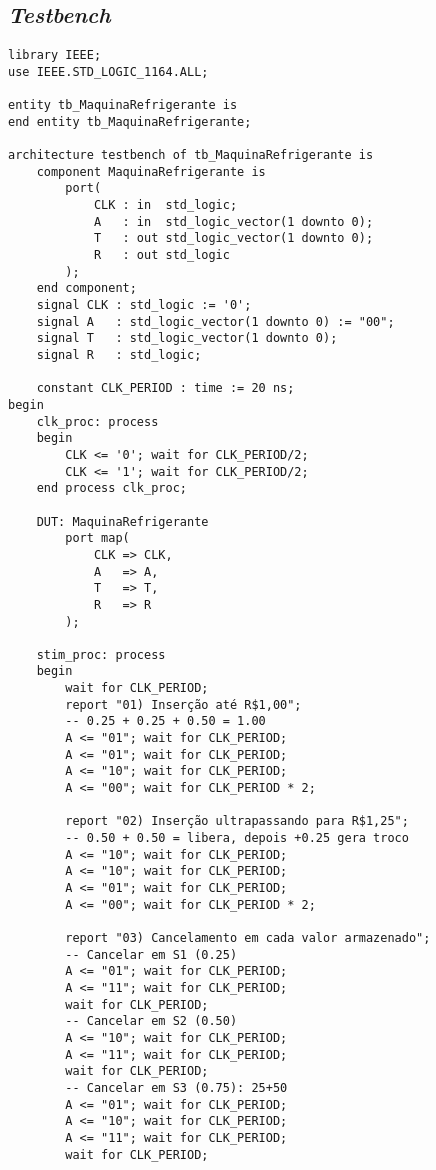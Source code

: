 \documentclass[a4paper,12pt]{article}
\newenvironment{code}{\captionsetup{type=listing}}{}
\begin{document}
\subsection{\textit{Testbench}}
\begin{code}
    \begin{verbatim}
library IEEE;
use IEEE.STD_LOGIC_1164.ALL;

entity tb_MaquinaRefrigerante is
end entity tb_MaquinaRefrigerante;

architecture testbench of tb_MaquinaRefrigerante is
    component MaquinaRefrigerante is
        port(
            CLK : in  std_logic;
            A   : in  std_logic_vector(1 downto 0);
            T   : out std_logic_vector(1 downto 0);
            R   : out std_logic
        );
    end component;
    signal CLK : std_logic := '0';
    signal A   : std_logic_vector(1 downto 0) := "00";
    signal T   : std_logic_vector(1 downto 0);
    signal R   : std_logic;

    constant CLK_PERIOD : time := 20 ns;
begin
    clk_proc: process
    begin
        CLK <= '0'; wait for CLK_PERIOD/2;
        CLK <= '1'; wait for CLK_PERIOD/2;
    end process clk_proc;

    DUT: MaquinaRefrigerante
        port map(
            CLK => CLK,
            A   => A,
            T   => T,
            R   => R
        );

    stim_proc: process
    begin
        wait for CLK_PERIOD;
        report "01) Inserção até R$1,00";
        -- 0.25 + 0.25 + 0.50 = 1.00
        A <= "01"; wait for CLK_PERIOD;
        A <= "01"; wait for CLK_PERIOD;
        A <= "10"; wait for CLK_PERIOD;
        A <= "00"; wait for CLK_PERIOD * 2;

        report "02) Inserção ultrapassando para R$1,25";
        -- 0.50 + 0.50 = libera, depois +0.25 gera troco
        A <= "10"; wait for CLK_PERIOD;
        A <= "10"; wait for CLK_PERIOD;
        A <= "01"; wait for CLK_PERIOD;
        A <= "00"; wait for CLK_PERIOD * 2;

        report "03) Cancelamento em cada valor armazenado";
        -- Cancelar em S1 (0.25)
        A <= "01"; wait for CLK_PERIOD;
        A <= "11"; wait for CLK_PERIOD;
        wait for CLK_PERIOD;
        -- Cancelar em S2 (0.50)
        A <= "10"; wait for CLK_PERIOD;
        A <= "11"; wait for CLK_PERIOD;
        wait for CLK_PERIOD;
        -- Cancelar em S3 (0.75): 25+50
        A <= "01"; wait for CLK_PERIOD;
        A <= "10"; wait for CLK_PERIOD;
        A <= "11"; wait for CLK_PERIOD;
        wait for CLK_PERIOD;


\end{verbatim}
\end{code}
\end{document}
